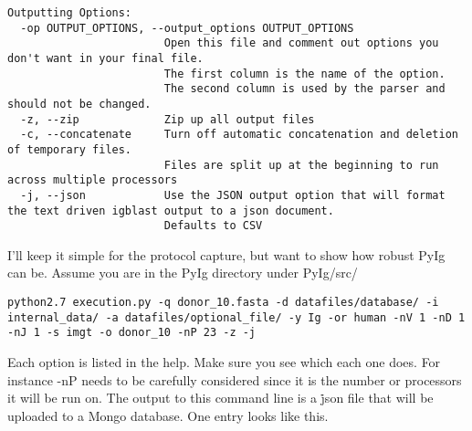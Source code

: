 \begin{lstlisting}[breaklines=true]
Outputting Options:
  -op OUTPUT_OPTIONS, --output_options OUTPUT_OPTIONS
                        Open this file and comment out options you don't want in your final file.
                        The first column is the name of the option.
                        The second column is used by the parser and should not be changed.
  -z, --zip             Zip up all output files
  -c, --concatenate     Turn off automatic concatenation and deletion of temporary files.
                        Files are split up at the beginning to run across multiple processors
  -j, --json            Use the JSON output option that will format the text driven igblast output to a json document.
                        Defaults to CSV
\end{lstlisting}


I'll keep it simple for the protocol capture, but want to show how robust PyIg can be. Assume you are in the PyIg directory under PyIg/src/

\begin{lstlisting}[breaklines=true]
python2.7 execution.py -q donor_10.fasta -d datafiles/database/ -i internal_data/ -a datafiles/optional_file/ -y Ig -or human -nV 1 -nD 1 -nJ 1 -s imgt -o donor_10 -nP 23 -z -j
\end{lstlisting}

Each option is listed in the help. Make sure you see which each one does. For instance -nP needs to be carefully considered since it is the number or processors it will be run on. The output to this command line is a \.json file that will be uploaded to a Mongo database. One entry looks like this.

